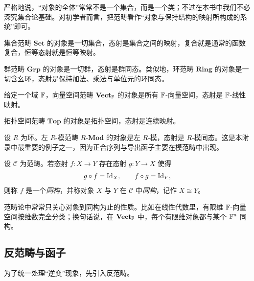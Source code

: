 \begin{remark}
严格地说，“对象的全体”常常不是一个集合，而是一个类；不过在本书中我们不必深究集合论基础。对初学者而言，把范畴看作“对象与保持结构的映射所构成的系统”即可。
\end{remark}

\begin{example}
集合范畴 $\mathbf{Set}$ 的对象是一切集合，态射是集合之间的映射，复合就是通常的函数复合，恒等态射就是恒等映射。
\end{example}

\begin{example}
群范畴 $\mathbf{Grp}$ 的对象是一切群，态射是群同态。类似地，环范畴 $\mathbf{Ring}$ 的对象是一切含幺环，态射是保持加法、乘法与单位元的环同态。
\end{example}

\begin{example}
给定一个域 $\mathbb{F}$，向量空间范畴 $\mathbf{Vect}_{\mathbb{F}}$ 的对象是所有 $\mathbb{F}$-向量空间，态射是 $\mathbb{F}$-线性映射。
\end{example}

\begin{example}
拓扑空间范畴 $\mathbf{Top}$ 的对象是拓扑空间，态射是连续映射。
\end{example}

\begin{example}
设 $R$ 为环。左 $R$-模范畴 $R\text{-}\mathbf{Mod}$ 的对象是左 $R$-模，态射是 $R$-模同态。这是本附录中最重要的例子之一，因为正合序列与导出函子主要在模范畴中出现。
\end{example}

\begin{definition}
设 $\mathcal C$ 为范畴。若态射 $f\colon X\to Y$ 存在态射 $g\colon Y\to X$ 使得
\[
  g\circ f=\mathrm{Id}_X,
  \qquad
  f\circ g=\mathrm{Id}_Y,
\]
则称 $f$ 是一个\emph{同构}，并称对象 $X$ 与 $Y$ 在 $\mathcal C$ 中\emph{同构}，记作 $X\cong Y$。
\end{definition}

\begin{remark}
范畴论中常常只关心对象到同构为止的性质。比如在线性代数里，有限维 $\mathbb{F}$-向量空间按维数完全分类；换句话说，在 $\mathbf{Vect}_{\mathbb{F}}$ 中，每个有限维对象都与某个 $\mathbb{F}^n$ 同构。
\end{remark}

\subsection{反范畴与函子}

为了统一处理“逆变”现象，先引入反范畴。


